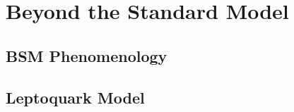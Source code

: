 \chapter{Beyond the Standard Model}
\label{chap:BSM}

\section{BSM Phenomenology}

\section{Leptoquark Model}